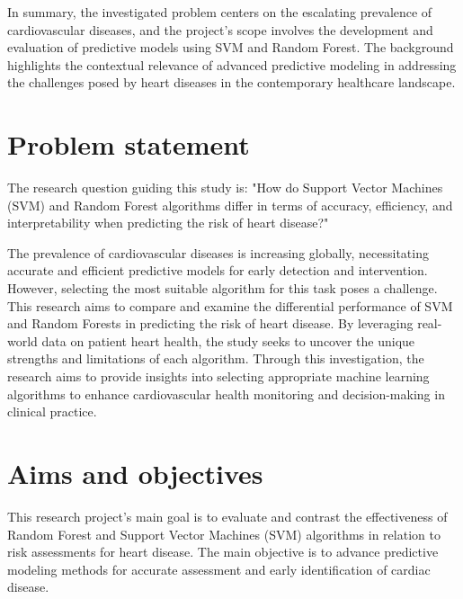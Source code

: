 In summary, the investigated problem centers on the escalating prevalence of cardiovascular diseases, and the project's scope involves the development and evaluation of predictive models using SVM and Random Forest. The background highlights the contextual relevance of advanced predictive modeling in addressing the challenges posed by heart diseases in the contemporary healthcare landscape.


\section{Problem statement}
\label{sec:intro_prob_art}

The research question guiding this study is: "How do Support Vector Machines (SVM) and Random Forest algorithms differ in terms of accuracy, efficiency, and interpretability when predicting the risk of heart disease?"

The prevalence of cardiovascular diseases is increasing globally, necessitating accurate and efficient predictive models for early detection and intervention. However, selecting the most suitable algorithm for this task poses a challenge. This research aims to compare and examine the differential performance of SVM and Random Forests in predicting the risk of heart disease. By leveraging real-world data\cite{lapp-heart-disease-dataset-1988} on patient heart health, the study seeks to uncover the unique strengths and limitations of each algorithm. Through this investigation, the research aims to provide insights into selecting appropriate machine learning algorithms to enhance cardiovascular health monitoring and decision-making in clinical practice.



\section{Aims and objectives}
\label{sec:intro_aims_obj}




This research project's main goal is to evaluate and contrast the effectiveness of Random Forest and Support Vector Machines (SVM) algorithms in relation to risk assessments for heart disease. The main objective is to advance predictive modeling methods for accurate assessment and early identification of cardiac disease.


